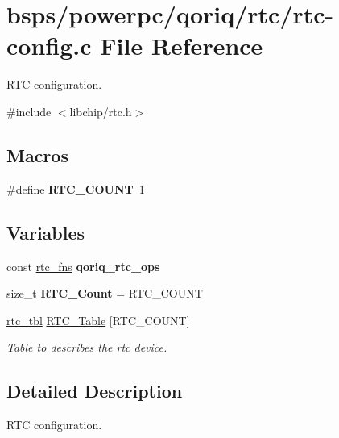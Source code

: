 \hypertarget{powerpc_2qoriq_2rtc_2rtc-config_8c}{}\section{bsps/powerpc/qoriq/rtc/rtc-\/config.c File Reference}
\label{powerpc_2qoriq_2rtc_2rtc-config_8c}


R\+TC configuration.  


{\ttfamily \#include $<$libchip/rtc.\+h$>$}\newline
\subsection*{Macros}
\begin{DoxyCompactItemize}
\item 
\mbox{\label{powerpc_2qoriq_2rtc_2rtc-config_8c_af40108e80c461d98dc5c5efe79b6a4aa}} 
\#define {\bfseries R\+T\+C\+\_\+\+C\+O\+U\+NT}~1
\end{DoxyCompactItemize}
\subsection*{Variables}
\begin{DoxyCompactItemize}
\item 
const \mbox{\hyperlink{struct__rtc__fns}{rtc\+\_\+fns}} {\bfseries qoriq\+\_\+rtc\+\_\+ops}
\item 
\mbox{\label{powerpc_2qoriq_2rtc_2rtc-config_8c_a7b04b3ddbc07be0bcfcd73fde9a9f399}} 
size\+\_\+t {\bfseries R\+T\+C\+\_\+\+Count} = R\+T\+C\+\_\+\+C\+O\+U\+NT
\item 
\mbox{\hyperlink{struct__rtc__tbl}{rtc\+\_\+tbl}} \mbox{\hyperlink{powerpc_2qoriq_2rtc_2rtc-config_8c_a4d681c66d42eb6dbbca44f073727d9d6}{R\+T\+C\+\_\+\+Table}} \mbox{[}R\+T\+C\+\_\+\+C\+O\+U\+NT\mbox{]}
\begin{DoxyCompactList}\small\item\em Table to describes the rtc device. \end{DoxyCompactList}\end{DoxyCompactItemize}


\subsection{Detailed Description}
R\+TC configuration. 



